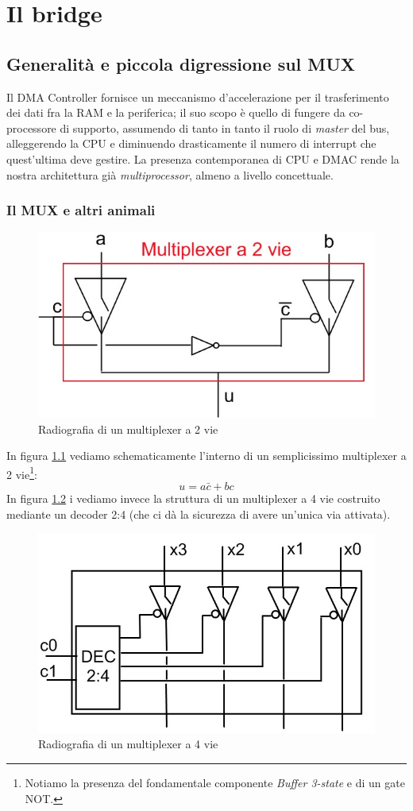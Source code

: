 \chapter{Il bridge}
\label{cha:bridge}

\section{Generalità e piccola digressione sul MUX}
\label{sec:generalitaDMAC}

Il DMA Controller fornisce un meccanismo d'accelerazione per il trasferimento dei dati fra la RAM e la periferica; il suo scopo è quello di fungere da co-processore di supporto, assumendo di tanto in tanto il ruolo di \textit{master} del bus, alleggerendo la CPU e diminuendo drasticamente il numero di interrupt che quest'ultima deve gestire. La presenza contemporanea di CPU e DMAC rende la nostra architettura già \textit{multiprocessor}, almeno a livello concettuale.

\subsection{Il MUX e altri animali}

\begin{figure}[!h]
\centering
\includegraphics[width=0.58743626456\columnwidth]{img/mux2vie}
\caption{Radiografia di un multiplexer a 2 vie}
\label{fig:mux2vie}
\end{figure}

In figura \ref{fig:mux2vie} vediamo schematicamente l'interno di un semplicissimo multiplexer a 2 vie\footnote{Notiamo la presenza del fondamentale componente \textit{Buffer 3-state} e di un gate NOT.}:
\[
u=a \bar c + bc
\]
In figura \ref{fig:mux4vie} i vediamo invece la struttura di un multiplexer a 4 vie costruito mediante un decoder 2:4 (che ci dà la sicurezza di avere un'unica via attivata).

\begin{figure}[!h]
\centering
\includegraphics[width=0.57676586356213452354687654324567876543\columnwidth]{img/mux4vie}
\caption{Radiografia di un multiplexer a 4 vie}
\label{fig:mux4vie}
\end{figure}

